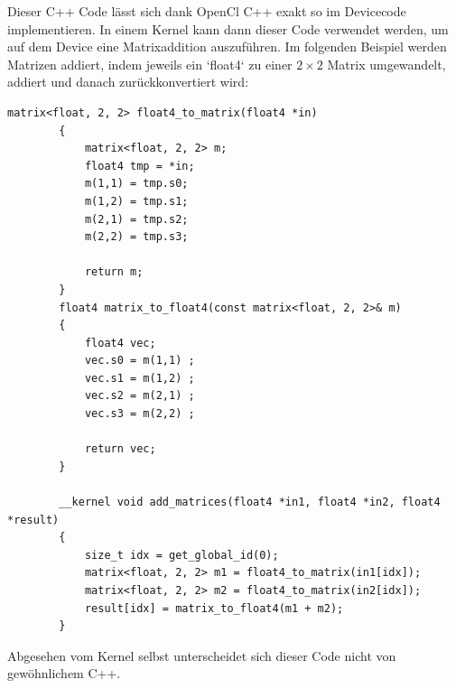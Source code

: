 		Dieser C++ Code lässt sich dank OpenCl C++ exakt so im Devicecode implementieren. In einem \Gls{Kernel} kann dann dieser Code verwendet werden, um auf dem Device eine Matrixaddition auszuführen. Im folgenden Beispiel werden Matrizen addiert, indem jeweils ein \li`float4` zu einer $2\times 2$ Matrix umgewandelt, addiert und danach zurückkonvertiert wird:	
		\begin{lstlisting}[caption=OpenCl C++ Kernel]
		matrix<float, 2, 2> float4_to_matrix(float4 *in) 
		{
			matrix<float, 2, 2> m;
			float4 tmp = *in;
			m(1,1) = tmp.s0;
			m(1,2) = tmp.s1;
			m(2,1) = tmp.s2;
			m(2,2) = tmp.s3;
			
			return m;
		}
		float4 matrix_to_float4(const matrix<float, 2, 2>& m)
		{
			float4 vec;
			vec.s0 = m(1,1) ;
			vec.s1 = m(1,2) ;
			vec.s2 = m(2,1) ;
			vec.s3 = m(2,2) ;

			return vec;
		}

		__kernel void add_matrices(float4 *in1, float4 *in2, float4 *result) 
		{
			size_t idx = get_global_id(0);
			matrix<float, 2, 2> m1 = float4_to_matrix(in1[idx]);
			matrix<float, 2, 2> m2 = float4_to_matrix(in2[idx]);
			result[idx] = matrix_to_float4(m1 + m2);
		}
		\end{lstlisting}
		
		Abgesehen vom \Gls{Kernel} selbst unterscheidet sich dieser Code nicht von gewöhnlichem C++.

